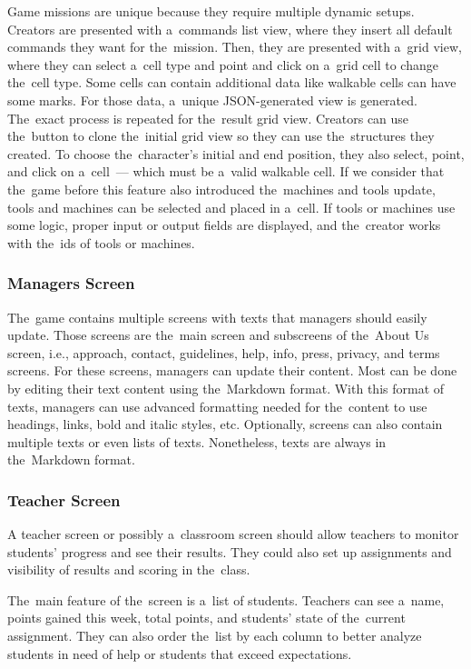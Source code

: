 Game missions are unique because they require multiple dynamic setups.
Creators are presented with a~commands list view, where they insert all default commands they want for the~mission.
Then, they are presented with a~grid view, where they can select a~cell type and point and click on a~grid cell to change the~cell type.
Some cells can contain additional data like walkable cells can have some marks.
For those data, a~unique JSON-generated view is generated.
The~exact process is repeated for the~result grid view.
Creators can use the~button to clone the~initial grid view so they can use the~structures they created.
To choose the~character's initial and end position, they also select, point, and click on a~cell~--- which must be a~valid walkable cell.
If we consider that the~game before this feature also introduced the~machines and tools update, tools and machines can be selected and placed in a~cell.
If tools or machines use some logic, proper input or output fields are displayed, and the~creator works with the~ids of tools or machines.

\subsubsection{Managers Screen}

The~game contains multiple screens with texts that managers should easily update.
Those screens are the~main screen and subscreens of the~About Us screen, i.e., approach, contact, guidelines, help, info, press, privacy, and terms screens.
For these screens, managers can update their content.
Most can be done by editing their text content using the~Markdown format.
With this format of texts, managers can use advanced formatting needed for the~content to use headings, links, bold and italic styles, etc.
Optionally, screens can also contain multiple texts or even lists of texts.
Nonetheless, texts are always in the~Markdown format.

\subsubsection{Teacher Screen}

A teacher screen or possibly a~classroom screen should allow teachers to monitor students' progress and see their results.
They could also set up assignments and visibility of results and scoring in the~class.

The~main feature of the~screen is a~list of students.
Teachers can see a~name, points gained this week, total points, and students' state of the~current assignment.
They can also order the~list by each column to better analyze students in need of help or students that exceed expectations.

